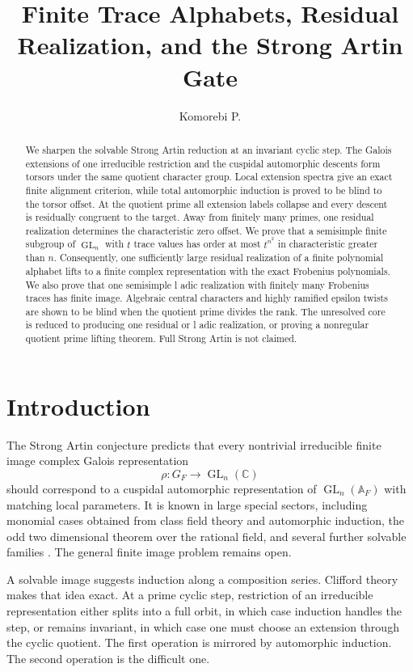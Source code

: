 \documentclass{aomart}
\title[Residual realization and Strong Artin]{Finite Trace Alphabets, Residual Realization, and the Strong Artin Gate}
\author[Komorebi P.]{Komorebi P.}
\theoremstyle{definition}
\theoremstyle{remark}
\newcommand{\CC}{\mathbb C}
\newcommand{\Adele}{\mathbb A}
\newcommand{\GL}{\operatorname{GL}}
\begin{document}
\begin{abstract}
We sharpen the solvable Strong Artin reduction at an invariant cyclic step. The Galois extensions of one irreducible restriction and the cuspidal automorphic descents form torsors under the same quotient character group. Local extension spectra give an exact finite alignment criterion, while total automorphic induction is proved to be blind to the torsor offset. At the quotient prime all extension labels collapse and every descent is residually congruent to the target. Away from finitely many primes, one residual realization determines the characteristic zero offset. We prove that a semisimple finite subgroup of \(\GL_n\) with \(t\) trace values has order at most \(t^{n^2}\) in characteristic greater than \(n\). Consequently, one sufficiently large residual realization of a finite polynomial alphabet lifts to a finite complex representation with the exact Frobenius polynomials. We also prove that one semisimple l adic realization with finitely many Frobenius traces has finite image. Algebraic central characters and highly ramified epsilon twists are shown to be blind when the quotient prime divides the rank. The unresolved core is reduced to producing one residual or l adic realization, or proving a nonregular quotient prime lifting theorem. Full Strong Artin is not claimed.
\end{abstract}
\maketitle
\makeatletter\gdef\addresses{}\makeatother
\thispagestyle{plain}

\section{Introduction}\label{sec:introduction}

The Strong Artin conjecture predicts that every nontrivial irreducible finite image complex Galois representation
\[
 \rho:G_F\longrightarrow\GL_n(\CC)
\]
should correspond to a cuspidal automorphic representation of \(\GL_n(\Adele_F)\) with matching local parameters. It is known in large special sectors, including monomial cases obtained from class field theory and automorphic induction, the odd two dimensional theorem over the rational field, and several further solvable families \cite{Langlands1980,Tunnell1981,ArthurClozel1989,Ramakrishnan2002}. The general finite image problem remains open.

A solvable image suggests induction along a composition series. Clifford theory makes that idea exact. At a prime cyclic step, restriction of an irreducible representation either splits into a full orbit, in which case induction handles the step, or remains invariant, in which case one must choose an extension through the cyclic quotient. The first operation is mirrored by automorphic induction. The second operation is the difficult one.
\end{document}
